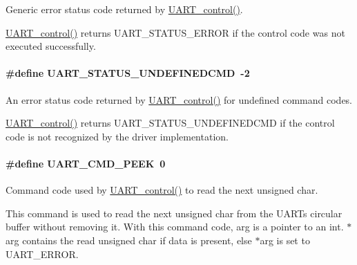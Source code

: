 Generic error status code returned by \hyperlink{_u_a_r_t_8h_a9de3c26cfe4ce6b7f350a6ea6e16801d}{U\+A\+R\+T\+\_\+control()}. 

\hyperlink{_u_a_r_t_8h_a9de3c26cfe4ce6b7f350a6ea6e16801d}{U\+A\+R\+T\+\_\+control()} returns U\+A\+R\+T\+\_\+\+S\+T\+A\+T\+U\+S\+\_\+\+E\+R\+R\+O\+R if the control code was not executed successfully. 
\paragraph[{U\+A\+R\+T\+\_\+\+S\+T\+A\+T\+U\+S\+\_\+\+U\+N\+D\+E\+F\+I\+N\+E\+D\+C\+M\+D}]{\setlength{\rightskip}{0pt plus 5cm}\#define U\+A\+R\+T\+\_\+\+S\+T\+A\+T\+U\+S\+\_\+\+U\+N\+D\+E\+F\+I\+N\+E\+D\+C\+M\+D~-\/2}\label{_u_a_r_t_8h_a61125a2eb8059fd8b96ad95edc68ac2b}


An error status code returned by \hyperlink{_u_a_r_t_8h_a9de3c26cfe4ce6b7f350a6ea6e16801d}{U\+A\+R\+T\+\_\+control()} for undefined command codes. 

\hyperlink{_u_a_r_t_8h_a9de3c26cfe4ce6b7f350a6ea6e16801d}{U\+A\+R\+T\+\_\+control()} returns U\+A\+R\+T\+\_\+\+S\+T\+A\+T\+U\+S\+\_\+\+U\+N\+D\+E\+F\+I\+N\+E\+D\+C\+M\+D if the control code is not recognized by the driver implementation. 
\paragraph[{U\+A\+R\+T\+\_\+\+C\+M\+D\+\_\+\+P\+E\+E\+K}]{\setlength{\rightskip}{0pt plus 5cm}\#define U\+A\+R\+T\+\_\+\+C\+M\+D\+\_\+\+P\+E\+E\+K~0}\label{_u_a_r_t_8h_a942596a37cb2109ae021f88f3d907bdc}


Command code used by \hyperlink{_u_a_r_t_8h_a9de3c26cfe4ce6b7f350a6ea6e16801d}{U\+A\+R\+T\+\_\+control()} to read the next unsigned char. 

This command is used to read the next unsigned char from the U\+A\+R\+T\textquotesingle{}s circular buffer without removing it. With this command code, arg is a pointer to an int. $\ast$arg contains the read unsigned char if data is present, else $\ast$arg is set to U\+A\+R\+T\+\_\+\+E\+R\+R\+O\+R. 
